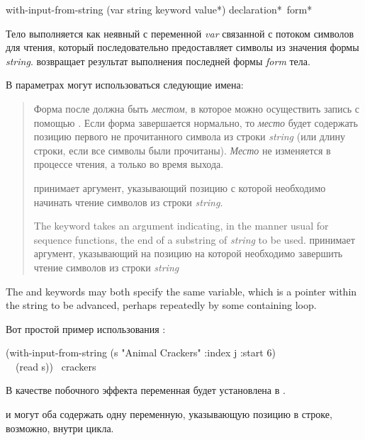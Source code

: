 \begin{defmac}
with-input-from-string (var string {keyword value}*)
      {declaration}* {\,form}*

Тело выполняется как неявный  с переменной \emph{var} связанной с
потоком символов для чтения, который последовательно предоставляет символы из
значения формы \emph{string}.  возвращает результат
выполнения последней формы \emph{form} тела.

В параметрах могут использоваться следующие имена:
\begin{quotation}
\begin{flushdesc}
\item[\cd{:index}]
Форма после  должна быть \emph{местом}, в которое можно осуществить
запись с помощью . Если форма  завершается
нормально, то \emph{место} будет содержать позицию первого не прочитанного
символа из строки \emph{string} (или длину строки, если все символы были
прочитаны).
\emph{Место} не изменяется в процессе чтения, а только во время выхода.

\item[\cd{:start}]
 принимает аргумент, указывающий позицию с которой
необходимо начинать чтение символов из строки \emph{string}.

\item[\cd{:end}]
The  keyword takes an argument indicating, in the manner
usual for sequence functions, the end of
a substring of \emph{string} to be used.
 принимает аргумент, указывающий на позицию на которой необходимо
завершить чтение символов из строки \emph{string}

\end{flushdesc}
\end{quotation}

The  and  keywords may both specify
the same variable, which is a pointer within the string to be advanced,
perhaps repeatedly by some containing loop.

Вот простой пример использования :
\begin{lisp}
(with-input-from-string (s "Animal Crackers" :index j :start 6) \\
~~(read s)) \EV\ crackers
\end{lisp}
В качестве побочного эффекта переменная  будет установлена в .

 и  могут оба содержать одну переменную, указывающую
позицию в строке, возможно, внутри цикла.
\end{defmac}

